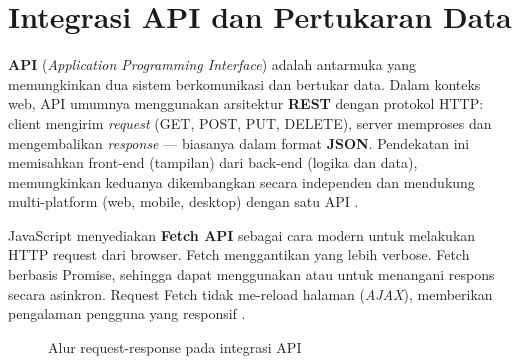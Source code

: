 \section{Integrasi API dan Pertukaran Data}

\textbf{API} (\textit{Application Programming Interface}) adalah antarmuka yang memungkinkan dua sistem berkomunikasi dan bertukar data. Dalam konteks web, API umumnya menggunakan arsitektur \textbf{REST} dengan protokol HTTP: client mengirim \textit{request} (GET, POST, PUT, DELETE), server memproses dan mengembalikan \textit{response} --- biasanya dalam format \textbf{JSON}. Pendekatan ini memisahkan front-end (tampilan) dari back-end (logika dan data), memungkinkan keduanya dikembangkan secara independen dan mendukung multi-platform (web, mobile, desktop) dengan satu API \cite{mdnJsGuide}.

JavaScript menyediakan \textbf{Fetch API} sebagai cara modern untuk melakukan HTTP request dari browser. Fetch menggantikan  yang lebih verbose. Fetch berbasis Promise, sehingga dapat menggunakan  atau  untuk menangani respons secara asinkron. Request Fetch tidak me-reload halaman (\textit{AJAX}), memberikan pengalaman pengguna yang responsif \cite{mdnJsGuide}.

\begin{figure}[ht]
\centering
{}
\caption{Alur request-response pada integrasi API}
\end{figure}

